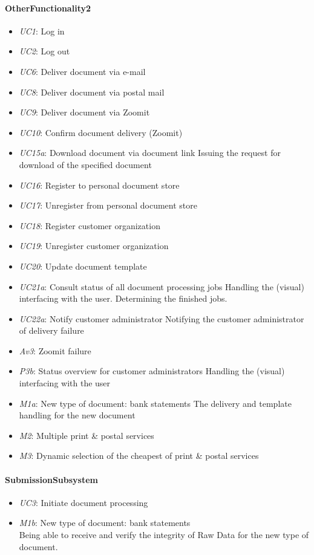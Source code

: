 \documentclass[a4paper,10pt]{article}
\begin{document}
\paragraph{OtherFunctionality2}
\begin{itemize}
    \item \emph{UC1}: Log in
    \item \emph{UC2}: Log out
    \item \emph{UC6}: Deliver document via e-mail
    \item \emph{UC8}: Deliver document via postal mail
    \item \emph{UC9}: Deliver document via Zoomit
    \item \emph{UC10}: Confirm document delivery (Zoomit)
    \item \emph{UC15a}: Download document via document link
    Issuing the request for download of the specified document
    \item \emph{UC16}: Register to personal document store
    \item \emph{UC17}: Unregister from personal document store
    \item \emph{UC18}: Register customer organization
    \item \emph{UC19}: Unregister customer organization
    \item \emph{UC20}: Update document template
    \item \emph{UC21a}: Consult status of all document processing jobs
    Handling the (visual) interfacing with the user. Determining the finished jobs.
    \item \emph{UC22a}: Notify customer administrator
    Notifying the customer administrator of delivery failure
    \item \emph{Av3}: Zoomit failure
    \item \emph{P3b}: Status overview for customer administrators
    Handling the (visual) interfacing with the user
    \item \emph{M1a}: New type of document: bank statements
    The delivery and template handling for the new document
    \item \emph{M2}: Multiple print \& postal services
    \item \emph{M3}: Dynamic selection of the cheapest of print \& postal services
\end{itemize}

\paragraph{SubmissionSubsystem}
\begin{itemize}
	\item \emph{UC3}: Initiate document processing
	\item \emph{M1b}: New type of document: bank statements\\
	Being able to receive and verify the integrity of Raw Data for the new type of document.
\end{itemize}
\end{document}
